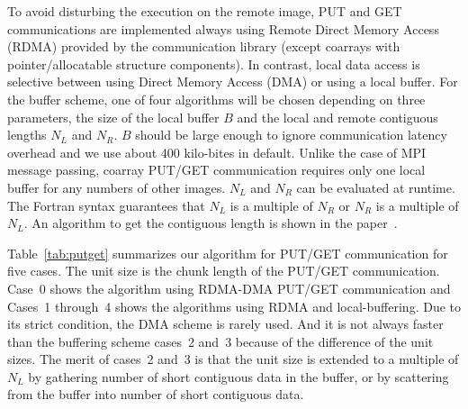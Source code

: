 To avoid disturbing the execution on the remote image, PUT and GET communications
are implemented always using Remote Direct Memory Access (RDMA) provided by 
the communication library (except coarrays with pointer/allocatable structure components). 
In contrast, local data access is selective between using Direct Memory Access (DMA) or
using a local buffer. For the buffer scheme, one of four algorithms will be chosen 
depending on three parameters, the size of the local buffer $B$ and the 
local and remote contiguous lengths $N_L$ and $N_R$.
$B$ should be large enough to ignore communication latency overhead and we use
about 400 kilo-bites in default. Unlike the case of MPI message passing,
coarray PUT/GET communication requires only one local buffer for any numbers of
other images.
$N_L$ and $N_R$ can be evaluated at runtime. The Fortran syntax guarantees 
that $N_L$ is a multiple of $N_R$ or $N_R$ is a multiple of $N_L$.
An algorithm to get the contiguous length is shown in the paper~\cite{pgas15}.

Table~\ref{tab:putget} summarizes our algorithm for PUT/GET communication for five cases.
The unit size is the chunk length of the PUT/GET communication.
Case~0 shows the algorithm using RDMA-DMA PUT/GET communication and Cases~1 through~4
shows the algorithms using RDMA and local-buffering. 
Due to its strict condition, the DMA scheme is rarely used.
And it is not always faster than the buffering scheme cases~2 and~3 because of the 
difference of the unit sizes. The merit of cases~2 and~3 is that the unit size 
is extended to a multiple of $N_L$ by gathering number of short contiguous data in the buffer,
or by scattering from the buffer into number of short contiguous data.

